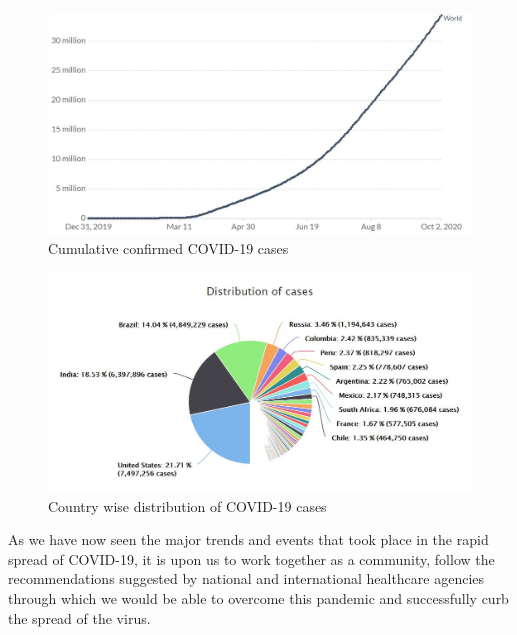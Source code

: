 \begin{figure}[H]
    \centering
    \includegraphics[width=15cm, height=6cm]{Images/totalCases.JPG}
    \caption[Total COVID-19 Cases]{Cumulative confirmed COVID-19 cases \cite{ECDC2020}}
    \label{fig:Total COVID-19 Cases}
    \end{figure}

   
\begin{figure}[H]
    \centering
    \includegraphics[width=15cm]{Images/casesDist.JPG}
    \caption[Distribution of COVID-19 Cases]{Country wise distribution of COVID-19 cases \cite{WMR2020}}
    \label{fig:COVID-19 Cases Country Wise Distribution}
    \end{figure}

    As we have now seen the major trends and events that took place in the rapid spread of COVID-19, it is upon us to work together as a community, follow the recommendations suggested by national and international healthcare agencies through which we would be able to overcome this pandemic and successfully curb the spread of the virus.